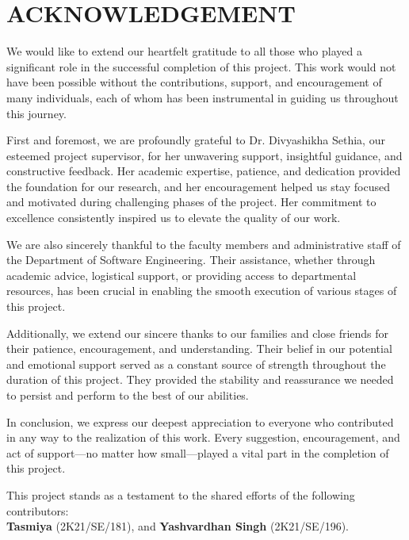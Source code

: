 \clearpage

\section*{\centering \large ACKNOWLEDGEMENT}

\vspace{2em}

\begin{doublespace}
  \justifying
  \noindent
  We would like to extend our heartfelt gratitude to all those who played a significant role in
  the successful completion of this project. This work would not have been possible without
  the contributions, support, and encouragement of many individuals, each of whom has
  been instrumental in guiding us throughout this journey.

  \vspace{1em}
  \noindent
  First and foremost, we are profoundly grateful to Dr. Divyashikha Sethia, our esteemed
  project supervisor, for her unwavering support, insightful guidance, and constructive feedback.
  Her academic expertise, patience, and dedication provided the foundation for our
  research, and her encouragement helped us stay focused and motivated during challenging
  phases of the project. Her commitment to excellence consistently inspired us to elevate
  the quality of our work.

  \vspace{1em}
  \noindent
  We are also sincerely thankful to the faculty members and administrative staff of the
  Department of Software Engineering. Their assistance, whether through academic advice,
  logistical support, or providing access to departmental resources, has been crucial in
  enabling the smooth execution of various stages of this project.

  \vspace{1em}
  \noindent
  Additionally, we extend our sincere thanks to our families and close friends for their
  patience, encouragement, and understanding. Their belief in our potential and emotional
  support served as a constant source of strength throughout the duration of this project.
  They provided the stability and reassurance we needed to persist and perform to the best
  of our abilities.

  \vspace{1em}
  \noindent
  In conclusion, we express our deepest appreciation to everyone who contributed in any way
  to the realization of this work. Every suggestion, encouragement, and act of support—no
  matter how small—played a vital part in the completion of this project.

  \vspace{1em}
  \noindent
  This project stands as a testament to the shared efforts of the following contributors:\\
  \textbf{Tasmiya} (2K21/SE/181), and \textbf{Yashvardhan Singh} (2K21/SE/196).
\end{doublespace}

\newpage
